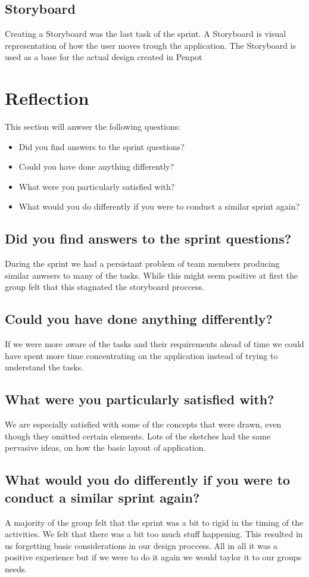 \documentclass[12pt]{article}
\begin{document}
\subsection{Storyboard}
Creating a Storyboard\cite{Storyboard2024} was the last task of the sprint.
A Storyboard is visual representation of how the user moves trough the application.
The Storyboard is used as a base for the actual design created in Penpot\cite{PenpotDesignTool}

\section{Reflection}
This section will anwser the following questions:
\begin{itemize}
    \item Did you find answers to the sprint questions?
    \item Could you have done anything differently?
    \item What were you particularly satisfied with?
    \item What would you do differently if you were to conduct a similar sprint again?
\end{itemize}

\subsection{Did you find answers to the sprint questions?}
During the sprint we had a persistant problem of team members producing similar anwsers to many of the tasks.
While this might seem positive at first the group felt that this stagnated the storyboard proccess.

\subsection{Could you have done anything differently?}
If we were more aware of the tasks and their requirements ahead of time we could have spent more time
concentrating on the application instead of trying to understand the tasks. 

\subsection{What were you particularly satisfied with?}
We are especially satisfied with some of the concepts that were drawn, even though they omitted certain elements.
Lots of the sketches had the same pervasive ideas, on how the basic layout of application. 


\subsection{What would you do differently if you were to conduct a similar sprint again?}
A majority of the group felt that the sprint was a bit to rigid in the timing of the activities.
We felt that there was a bit too much stuff happening. This resulted in us forgetting
basic considerations in our design proccess. All in all it was a positive experience
but if we were to do it again we would taylor it to our groups needs.

\printbibliography
\end{document}
